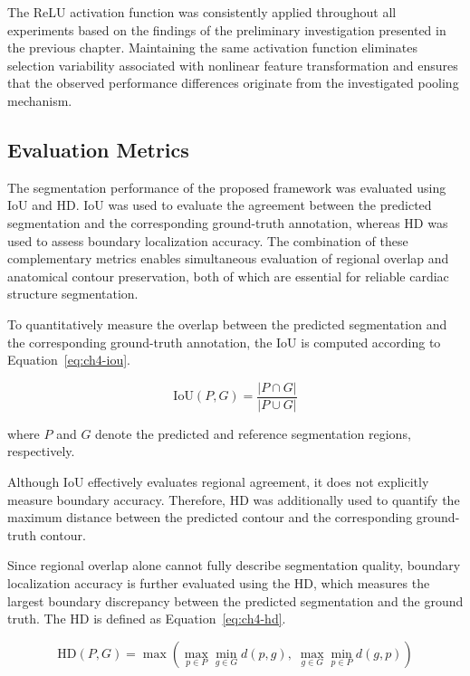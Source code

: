 The ReLU activation function was consistently applied throughout all experiments based on the findings of the preliminary investigation presented in the previous chapter. Maintaining the same activation function eliminates selection variability associated with nonlinear feature transformation and ensures that the observed performance differences originate from the investigated pooling mechanism.

\subsection{Evaluation Metrics}
\label{subsec:ch4-metrics}

The segmentation performance of the proposed framework was evaluated using IoU and HD. IoU was used to evaluate the agreement between the predicted segmentation and the corresponding ground-truth annotation, whereas HD was used to assess boundary localization accuracy. The combination of these complementary metrics enables simultaneous evaluation of regional overlap and anatomical contour preservation, both of which are essential for reliable cardiac structure segmentation.

To quantitatively measure the overlap between the predicted segmentation and the corresponding ground-truth annotation, the IoU is computed according to Equation~\eqref{eq:ch4-iou}.

\begin{equation}
	\mathrm{IoU}(P,G)
	=
	\frac{|P\cap G|}{|P\cup G|}
	\label{eq:ch4-iou}
\end{equation}

where \(P\) and \(G\) denote the predicted and reference segmentation regions, respectively.

Although IoU effectively evaluates regional agreement, it does not explicitly measure boundary accuracy. Therefore, HD was additionally used to quantify the maximum distance between the predicted contour and the corresponding ground-truth contour.

Since regional overlap alone cannot fully describe segmentation quality, boundary localization accuracy is further evaluated using the HD, which measures the largest boundary discrepancy between the predicted segmentation and the ground truth. The HD is defined as Equation~\eqref{eq:ch4-hd}.

\begin{equation}
	\mathrm{HD}(P,G)
	=
	\max
	\left(
	\max_{p\in P}\min_{g\in G} d(p,g),
	\;
	\max_{g\in G}\min_{p\in P} d(g,p)
	\right)
	\label{eq:ch4-hd}
\end{equation}

